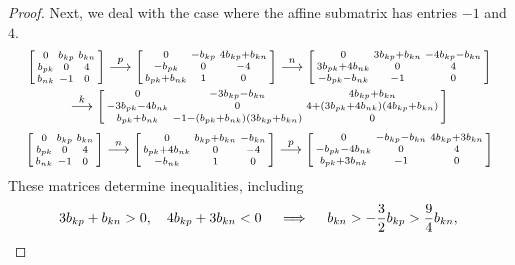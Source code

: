 \documentclass{amsart}
\theoremstyle{definition}
\theoremstyle{remark}
\numberwithin{equation}{section}
\newcommand{\0}{{\mathbf{0}}}
\begin{document}
\begin{proof}
Next, we deal with the case where the affine submatrix has entries $-1$ and $4$.
\begin{multline*}
\begin{bsmallmatrix*}
	0 & b_{kp} & b_{kn} \\
	b_{pk} & 0 & 4	 \\
	b_{nk} & -1 & 0
\end{bsmallmatrix*}
\overset{p}{\longrightarrow}
\begin{bsmallmatrix*}
	0 & -b_{kp} & 4b_{kp}+b_{kn} \\
	-b_{pk} & 0 & -4 \\
	b_{pk}+b_{nk}& 1 & 0
\end{bsmallmatrix*}
\overset{n}{\longrightarrow}
\begin{bsmallmatrix*}
	0 & 3b_{kp}+b_{kn}& -4b_{kp}-b_{kn} \\
	3b_{pk}+4b_{nk} & 0 & 4 \\
	-b_{pk}-b_{nk}& -1 & 0
\end{bsmallmatrix*}\\
\overset{k}{\longrightarrow}
\begin{bsmallmatrix*}
	0 & -3b_{kp}-b_{kn}& 4b_{kp}+b_{kn} \\
	-3b_{pk}-4b_{nk} & 0 & 4+(3b_{pk}+4b_{nk})(4b_{kp}+b_{kn}) \\
	b_{pk}+b_{nk}& -1-(b_{pk}+b_{nk})(3b_{kp}+b_{kn}) & 0
\end{bsmallmatrix*}
\end{multline*}
\begin{multline*}
\begin{bsmallmatrix*}
	0 & b_{kp} & b_{kn} \\
	b_{pk} & 0 & 4	 \\
	b_{nk} & -1 & 0
\end{bsmallmatrix*}\overset{n}{\longrightarrow}
\begin{bsmallmatrix*}
	0 & b_{kp}+b_{kn} & -b_{kn} \\
	b_{pk}+4b_{nk} & 0 & -4	 \\
	-b_{nk} & 1 & 0
\end{bsmallmatrix*}\overset{p}{\longrightarrow}
\begin{bsmallmatrix*}
	0 & -b_{kp}-b_{kn} & 4b_{kp}+3b_{kn} \\
	-b_{pk}-4b_{nk} & 0 & 4	 \\
	b_{pk}+3b_{nk} & -1 & 0
\end{bsmallmatrix*}
\end{multline*}
These matrices determine inequalities, including
\[
3b_{kp}+b_{kn}>0,\quad 4b_{kp}+3b_{kn}<0\quad \implies\quad b_{kn}>-\frac32b_{kp}>\frac94b_{kn},\\
\]
\end{proof}
\end{document}
